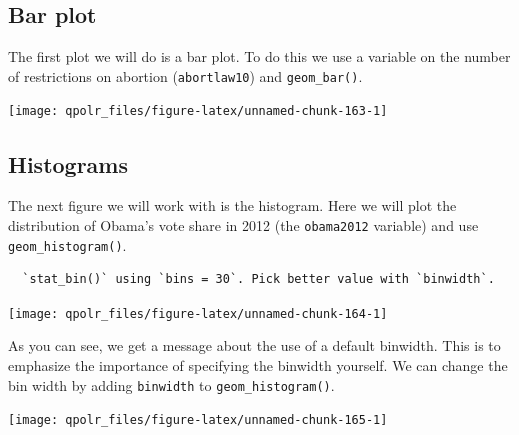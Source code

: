 \documentclass[12pt,oneside]{reedthesis}
\theoremstyle{definition}
\theoremstyle{definition}
\theoremstyle{definition}
\theoremstyle{remark}
\begin{document}
  \subsection{Bar plot}\label{bar-plot}
  
  The first plot we will do is a bar plot. To do this we use a variable on
  the number of restrictions on abortion (\texttt{abortlaw10}) and
  \texttt{geom\_bar()}.
  \begin{Shaded}
  \begin{Highlighting}[]
  \NormalTok{(}\OperatorTok{+}
  \StringTok{  }\NormalTok{() }
  \end{Highlighting}
  \end{Shaded}
  \begin{center}\texttt{[image: qpolr\_files/figure-latex/unnamed-chunk-163-1]} \end{center}
  
  \subsection{Histograms}\label{histograms}
  
  The next figure we will work with is the histogram. Here we will plot
  the distribution of Obama's vote share in 2012 (the \texttt{obama2012}
  variable) and use \texttt{geom\_histogram()}.
  \begin{Shaded}
  \begin{Highlighting}[]
  \NormalTok{(}\OperatorTok{+}
  \StringTok{  }\NormalTok{() }
  \end{Highlighting}
  \end{Shaded}
  \begin{verbatim}
  `stat_bin()` using `bins = 30`. Pick better value with `binwidth`.
  \end{verbatim}
  \begin{center}\texttt{[image: qpolr\_files/figure-latex/unnamed-chunk-164-1]} \end{center}
  
  As you can see, we get a message about the use of a default binwidth.
  This is to emphasize the importance of specifying the binwidth yourself.
  We can change the bin width by adding \texttt{binwidth} to
  \texttt{geom\_histogram()}.
  \begin{Shaded}
  \begin{Highlighting}[]
  \NormalTok{(}\OperatorTok{+}
  \StringTok{  }\NormalTok{(} \NormalTok{)}
  \end{Highlighting}
  \end{Shaded}
  \begin{center}\texttt{[image: qpolr\_files/figure-latex/unnamed-chunk-165-1]} \end{center}
  
\end{document}
